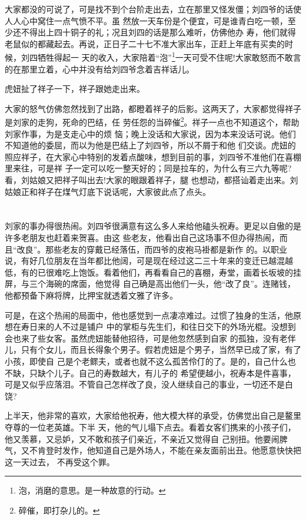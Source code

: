 \documentclass[11pt,a4paper,onecolumn]{article}
\begin{document}
大家都没的可说了，可是找不到个台阶走出去，立在那里又怪发僵；刘四爷的话使人人心中窝住一点气愤不平。虽
然放一天车份是个便宜，可是谁青白吃一顿，至少还不得出上四十铜子的礼；况且刘四的话是那么难听，仿佛他办
寿，他们就得老鼠似的都藏起去。再说，正日子二十七不准大家出车，正赶上年底有买卖的时候，刘四牺牲得起一
天的收入，大家陪着``泡''\footnote{泡，消磨的意思。是一种故意的行动。}一天可受不住呢!大家敢怒而不敢言
的在那里立着，心中并没有给刘四爷念着吉祥话儿。

虎妞扯了祥子一下，祥子跟她走出来。

大家的怒气仿佛忽然找到了出路，都瞪着祥子的后影。这两天了，大家都觉得祥子是刘家的走狗，死命的巴结，任
劳任怨的当碎催\footnote{碎催，即打杂儿的。}。祥子一点也不知道这个，帮助刘家作事，为是支走心中的烦
恼；晚上没话和大家说，因为本来没话可说。他们不知道他的委屈，而以为他是巴结上了刘四爷，所以不屑于和他
们交谈。虎妞的照应祥子，在大家心中特别的发着点酸味，想到目前的事，刘四爷不准他们在喜棚里来往，可是祥
子一定可以吃一整天好的；同是拉车的，为什么有三六九等呢?看，刘姑娘又把祥子叫出去!大家的眼跟着祥子，腿
也想动，都搭讪着走出来。刘姑娘正和祥子在煤气灯底下说话呢，大家彼此点了点头。

\pagebreak
\section{}

刘家的事办得很热闹。刘四爷很满意有这么多人来给他磕头祝寿。更足以自傲的是许多老朋友也赶着来贺喜。由这
些老友，他看出自己这场事不但办得热闹，而且``改良''。那些老友的穿戴已经落伍，而四爷的皮袍马褂都是新作
的。以职业说，有好几位朋友在当年都比他阔，可是现在\myrule 经过这二三十年来的变迁\myrule 已越混越
低，有的已很难吃上饱饭。看着他们，再看看自己的喜棚，寿堂，画着长坂坡的挂屏，与三个海碗的席面，他觉得
自己确是高出他们一头，他``改了良''。连赌钱，他都预备下麻将牌，比押宝就透着文雅了许多。

可是，在这个热闹的局面中，他也感觉到一点凄凉难过。过惯了独身的生活，他原想在寿日来的人不过是铺户
中的掌柜与先生们，和往日交下的外场光棍。没想到会也来了些女客。虽然虎妞能替他招待，可是他忽然感到自家
的孤独，没有老伴儿，只有个女儿，而且长得象个男子。假若虎妞是个男子，当然早已成了家，有了小孩，即使自
己是个老鳏夫，或者也就不这么孤苦伶仃的了。是的，自己什么也不缺，只缺个儿子。自己的寿数越大，有儿子的
希望便越小，祝寿本是件喜事，可是又似乎应落泪。不管自己怎样改了良，没人继续自己的事业，一切还不是白饶?

上半天，他非常的喜欢，大家给他祝寿，他大模大样的承受，仿佛觉出自己是鳌里夺尊的一位老英雄。下半
天，他的气儿塌下点去。看着女客们携来的小孩子们，他又羡慕，又忌妒，又不敢和孩子们亲近，不亲近又觉得自
己别扭。他要闹脾气，又不肯登时发作，他知道自己是外场人，不能在亲友面前出丑。他愿意快快把这一天过去，
不再受这个罪。
\end{document}
